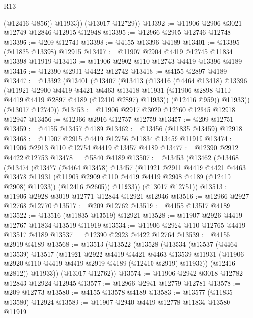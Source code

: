 \begin{lexlean}{R13}
\begin{coremodule}
            (@12416 @856))
          @11933))
      (@13017 @12729))
@13392 := @11906 @2906 @3021 @12749 @12846 @12915 @12948
@13395 := @12966 @2905 @12746 @12748
@13396 := @209 @12740
@13398 := @4155 @13396 @4189
@13401 := @13395 (@11835 @13398) @12915
@13407 := @11907 @2904 @4419 @12745 @11834 @13398 @11919
@13413 := @11906 @2902 @110 @12743 @4419 @13396 @4189
@13416 := @12390 @2901 @4422 @12742
@13418 := @4155 @2897 @4189
@13447 := @13392
    (@13401
      (@13407
        (@13413
          (@13416
            (@4464 @13418)
            @13396
            (@11921
              @2900
              @4419
              @4421
              @4463
              @13418
              @11931
              (@11906 @2898 @110 @4419 @4419 @2897 @4189 (@12410 @2897) @11933))
            (@12416 @959))
          @11933))
      (@13017 @12740))
@13453 := @11906 @2917 @3020 @12760 @12845 @12918 @12947
@13456 := @12966 @2916 @12757 @12759
@13457 := @209 @12751
@13459 := @4155 @13457 @4189
@13462 := @13456 (@11835 @13459) @12918
@13468 := @11907 @2915 @4419 @12756 @11834 @13459 @11919
@13474 := @11906 @2913 @110 @12754 @4419 @13457 @4189
@13477 := @12390 @2912 @4422 @12753
@13478 := @5840 @4189
@13507 := @13453
    (@13462
      (@13468
        (@13474
          (@13477
            (@4464 @13478)
            @13457
            (@11921
              @2911
              @4419
              @4421
              @4463
              @13478
              @11931
              (@11906 @2909 @110 @4419 @4419 @2908 @4189 (@12410 @2908) @11933))
            (@12416 @2605))
          @11933))
      (@13017 @12751))
@13513 := @11906 @2928 @3019 @12771 @12844 @12921 @12946
@13516 := @12966 @2927 @12768 @12770
@13517 := @209 @12762
@13519 := @4155 @13517 @4189
@13522 := @13516 (@11835 @13519) @12921
@13528 := @11907 @2926 @4419 @12767 @11834 @13519 @11919
@13534 := @11906 @2924 @110 @12765 @4419 @13517 @4189
@13537 := @12390 @2923 @4422 @12764
@13539 := @4155 @2919 @4189
@13568 := @13513
    (@13522
      (@13528
        (@13534
          (@13537
            (@4464 @13539)
            @13517
            (@11921
              @2922
              @4419
              @4421
              @4463
              @13539
              @11931
              (@11906 @2920 @110 @4419 @4419 @2919 @4189 (@12410 @2919) @11933))
            (@12416 @2812))
          @11933))
      (@13017 @12762))
@13574 := @11906 @2942 @3018 @12782 @12843 @12924 @12945
@13577 := @12966 @2941 @12779 @12781
@13578 := @209 @12773
@13580 := @4155 @13578 @4189
@13583 := @13577 (@11835 @13580) @12924
@13589 := @11907 @2940 @4419 @12778 @11834 @13580 @11919

\end{coremodule}
\end{lexlean}

